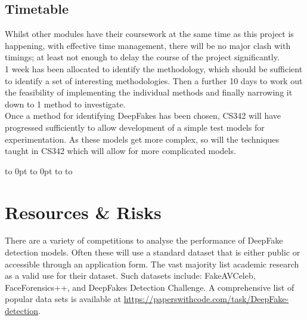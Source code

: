 \newpage
\thispagestyle{empty}
\def\fillandplacepagenumber{
 \par\pagestyle{empty}
 \vbox to 0pt{\vss}\vfill
 \vbox to 0pt{\baselineskip0pt
   \hbox to\linewidth{\hss}
   \baselineskip\footskip
   \hbox to\linewidth{
     \hfil\thepage\hfil}\vss}}
\begin{landscape}
\section{Timetable}
\begin{center}
    \resizebox{1.5\textwidth}{!}{}
\end{center}

\noindent
Whilst other modules have their coursework at the same time as this project is happening, with effective time management, there will be no major clash with timings; at least not enough to delay the course of the project significantly.\\

1 week has been allocated to identify the methodology, which should be sufficient to identify a set of interesting methodologies. Then a further 10 days to work out the feasibility of implementing the individual methods and finally narrowing it down to 1 method to investigate.\\

Once a method for identifying DeepFakes has been chosen, CS342 will have progressed sufficiently to allow development of a simple test models for experimentation. As these models get more complex, so will the techniques taught in CS342 which will allow for more complicated models.\\

\fillandplacepagenumber
\end{landscape}

\section{Resources \& Risks}
There are a variety of competitions to analyse the performance of DeepFake detection models. Often these will use a standard dataset that is either public or accessible through an application form. The vast majority list academic research as a valid use for their dataset. Such datasets include: FakeAVCeleb\cite{deepfake-detection-challenge}, FaceForensics++\cite{roessler2019faceforensicspp}, and DeepFakes Detection Challenge\cite{DDD_GoogleJigSaw2019}. A comprehensive list of popular data sets is available at \url{https://paperswithcode.com/task/DeepFake-detection}.\\

